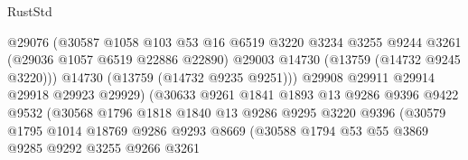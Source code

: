 \begin{lexlean}{RustStd}
\begin{coremodule}
                                    @29076
                                    (@30587
                                      @1058
                                      @103
                                      @53
                                      @16
                                      @6519
                                      @3220
                                      @3234
                                      @3255
                                      @9244
                                      @3261
                                      (@29036 @1057 @6519 @22886 @22890)
                                      @29003
                                      @14730
                                      (@13759 (@14732 @9245 @3220)))
                                    @14730
                                    (@13759 (@14732 @9235 @9251)))
                                  @29908
                                  @29911
                                  @29914
                                  @29918
                                  @29923
                                  @29929)
                                (@30633
                                  @9261
                                  @1841
                                  @1893
                                  @13
                                  @9286
                                  @9396
                                  @9422
                                  @9532
                                  (@30568
                                    @1796
                                    @1818
                                    @1840
                                    @13
                                    @9286
                                    @9295
                                    @3220
                                    @9396
                                    (@30579
                                      @1795
                                      @1014
                                      @18769
                                      @9286
                                      @9293
                                      @8669
                                      (@30588
                                        @1794
                                        @53
                                        @55
                                        @3869
                                        @9285
                                        @9292
                                        @3255
                                        @9266
                                        @3261

\end{coremodule}
\end{lexlean}
